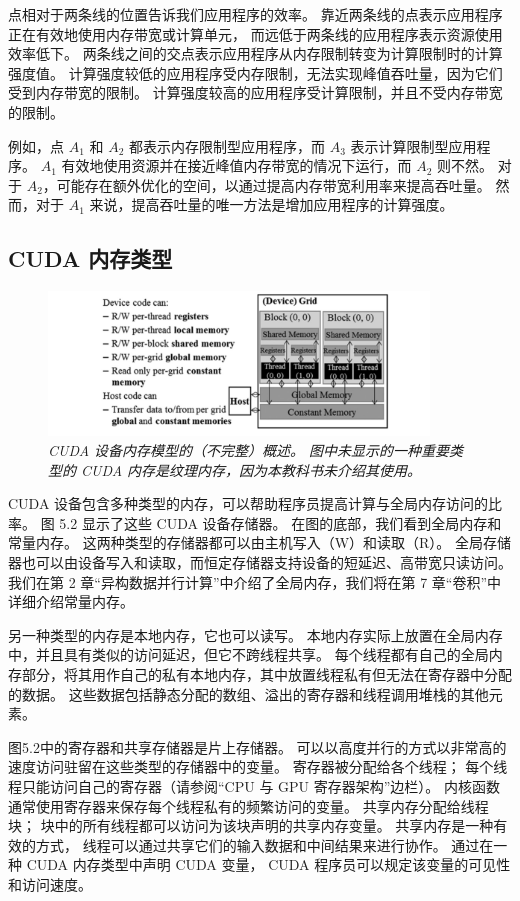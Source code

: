 \begin{remark}[Roofline 模型]
点相对于两条线的位置告诉我们应用程序的效率。 靠近两条线的点表示应用程序正在有效地使用内存带宽或计算单元，
而远低于两条线的应用程序表示资源使用效率低下。 两条线之间的交点表示应用程序从内存限制转变为计算限制时的计算强度值。 
计算强度较低的应用程序受内存限制，无法实现峰值吞吐量，因为它们受到内存带宽的限制。 
计算强度较高的应用程序受计算限制，并且不受内存带宽的限制。

例如，点 $A_1$ 和 $A_2$ 都表示内存限制型应用程序，而 $A_3$ 表示计算限制型应用程序。 
$A_1$ 有效地使用资源并在接近峰值内存带宽的情况下运行，而 $A_2$ 则不然。 
对于 $A_2$，可能存在额外优化的空间，以通过提高内存带宽利用率来提高吞吐量。 
然而，对于 $A_1$ 来说，提高吞吐量的唯一方法是增加应用程序的计算强度。
\end{remark}

\subsection{CUDA 内存类型}
\begin{figure}[H]
	\centering
	\includegraphics[width=0.9\textwidth]{figs/F5.2.png}
	\caption{\textit{CUDA 设备内存模型的（不完整）概述。 
	图中未显示的一种重要类型的 CUDA 内存是纹理内存，因为本教科书未介绍其使用。}}
\end{figure}

CUDA 设备包含多种类型的内存，可以帮助程序员提高计算与全局内存访问的比率。 图 5.2 显示了这些 CUDA 设备存储器。 
在图的底部，我们看到全局内存和常量内存。 这两种类型的存储器都可以由主机写入（W）和读取（R）。 
全局存储器也可以由设备写入和读取，而恒定存储器支持设备的短延迟、高带宽只读访问。 
我们在第 2 章“异构数据并行计算”中介绍了全局内存，我们将在第 7 章“卷积”中详细介绍常量内存。

另一种类型的内存是本地内存，它也可以读写。 本地内存实际上放置在全局内存中，并且具有类似的访问延迟，但它不跨线程共享。 
每个线程都有自己的全局内存部分，将其用作自己的私有本地内存，其中放置线程私有但无法在寄存器中分配的数据。 
这些数据包括静态分配的数组、溢出的寄存器和线程调用堆栈的其他元素。

图5.2中的寄存器和共享存储器是片上存储器。 可以以高度并行的方式以非常高的速度访问驻留在这些类型的存储器中的变量。 
寄存器被分配给各个线程； 每个线程只能访问自己的寄存器（请参阅“CPU 与 GPU 寄存器架构”边栏）。 
内核函数通常使用寄存器来保存每个线程私有的频繁访问的变量。 共享内存分配给线程块； 
块中的所有线程都可以访问为该块声明的共享内存变量。 共享内存是一种有效的方式，
线程可以通过共享它们的输入数据和中间结果来进行协作。 通过在一种 CUDA 内存类型中声明 CUDA 变量，
CUDA 程序员可以规定该变量的可见性和访问速度。

